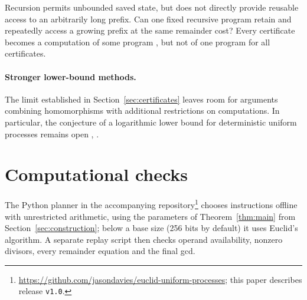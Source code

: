 \documentclass[11pt]{article}
\theoremstyle{remark}
\begin{document}
Recursion permits unbounded saved state, but does not directly provide
reusable access to an arbitrarily long prefix. Can one fixed recursive
program retain and repeatedly access a growing prefix at the same remainder
cost? Every certificate becomes a computation of some program
\cite[Proposition~2E.1]{moschovakis2019}, but not of one program for all
certificates.

\paragraph{Stronger lower-bound methods.}
The limit established in Section~\ref{sec:certificates} leaves room for
arguments combining homomorphisms with additional restrictions on
computations. In particular, the conjecture of a logarithmic lower bound
for deterministic uniform processes remains open
\cite[Conjecture~3.9, p.~23]{moschovakis2012},
\cite[\S4H and p.~188]{moschovakis2019}.

\section{Computational checks}\label{sec:checks}
The Python planner in the accompanying
repository\footnote{\url{https://github.com/jasondavies/euclid-uniform-processes};
this paper describes release \texttt{v1.0}.}
chooses instructions offline with unrestricted arithmetic, using the
parameters of Theorem~\ref{thm:main} from Section~\ref{sec:construction};
below a base size (256 bits by default) it uses Euclid's algorithm. A separate replay script then checks
operand availability, nonzero divisors, every remainder equation and the
final gcd.
\end{document}

